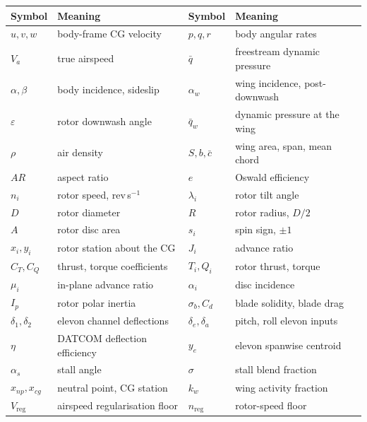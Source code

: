 \documentclass[11pt,a4paper]{article}
\begin{document}
\begin{longtable}{@{}p{2.6cm}p{6.1cm}p{2.4cm}p{4.6cm}@{}}
\toprule
\textbf{Symbol} & \textbf{Meaning} & \textbf{Symbol} & \textbf{Meaning}\\
\midrule
\endhead
$u,v,w$            & body-frame CG velocity            & $p,q,r$          & body angular rates \\
$V_a$              & true airspeed                     & $\bar q$         & freestream dynamic pressure \\
$\alpha,\beta$     & body incidence, sideslip          & $\alpha_w$       & wing incidence, post-downwash \\
$\varepsilon$      & rotor downwash angle              & $\bar q_w$       & dynamic pressure at the wing \\
$\rho$             & air density                       & $S,b,\bar c$     & wing area, span, mean chord \\
$A\!R$             & aspect ratio                      & $e$              & Oswald efficiency \\
$n_i$              & rotor speed, rev\,s$^{-1}$        & $\lambda_i$      & rotor tilt angle \\
$D$                & rotor diameter                    & $R$              & rotor radius, $D/2$ \\
$A$                & rotor disc area                   & $s_i$            & spin sign, $\pm1$ \\
$x_i,y_i$          & rotor station about the CG        & $J_i$            & advance ratio \\
$C_T,C_Q$          & thrust, torque coefficients       & $T_i,Q_i$        & rotor thrust, torque \\
$\mu_i$            & in-plane advance ratio            & $\alpha_i$       & disc incidence \\
$I_p$              & rotor polar inertia               & $\sigma_b,C_{d}$ & blade solidity, blade drag \\
$\delta_1,\delta_2$& elevon channel deflections        & $\delta_e,\delta_a$ & pitch, roll elevon inputs \\
$\eta$             & DATCOM deflection efficiency      & $y_{\!e}$        & elevon spanwise centroid \\
$\alpha_{s}$       & stall angle                       & $\sigma$         & stall blend fraction \\
$x_{np},x_{cg}$    & neutral point, CG station         & $k_w$            & wing activity fraction \\
$V_{\!\mathrm{reg}}$ & airspeed regularisation floor   & $n_{\mathrm{reg}}$ & rotor-speed floor \\
\bottomrule
\end{longtable}
\end{document}
